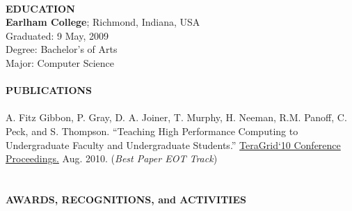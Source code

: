 \documentclass[10pt]{article}
\begin{document}
\pagebreak

~\\
\textbf{EDUCATION}~\\
\indent \textbf{Earlham College}; Richmond, Indiana, USA~\\
\indent Graduated: 9 May, 2009~\\
\indent Degree: Bachelor's of Arts~\\
\indent Major: Computer Science~\\
~\\
\textbf{PUBLICATIONS}~\\
	~\\
	\indent A. Fitz Gibbon, P. Gray, D. A. Joiner, T. Murphy, H. Neeman, R.M. Panoff, C. Peck, and S. Thompson. ``Teaching High Performance Computing to Undergraduate Faculty and Undergraduate Students.'' \underline{TeraGrid`10 Conference Proceedings.} Aug. 2010. (\emph{Best Paper EOT Track})
~\\
~\\
~\\
\textbf{AWARDS, RECOGNITIONS, and ACTIVITIES}~\\
\vspace{-4mm}
\end{document}
